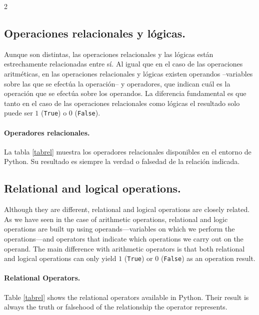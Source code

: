 \begin{paracol}{2}
\subsection{Operaciones relacionales y lógicas.}
Aunque son distintas, las operaciones relacionales y las lógicas están estrechamente relacionadas entre sí. Al igual que en el caso de las operaciones aritméticas, en las operaciones relacionales y lógicas existen operandos --variables sobre las que se efectúa la operación-- y operadores, que indican cuál es la operación que se efectúa sobre los operandos. La diferencia fundamental es que tanto en el caso de las operaciones relacionales como lógicas el resultado solo puede ser $1$ (\texttt{True}) o $0$ (\texttt{False}). 

\paragraph{Operadores relacionales.}La tabla \ref{tabrel} muestra los operadores relacionales disponibles en el entorno de Python. Su resultado es siempre la verdad o falsedad de la relación indicada. 
\switchcolumn
\subsection{Relational and logical operations.}
Although they are different, relational and logical operations are closely related. As we have seen in the case of arithmetic operations, relational and logic operations are built up using operands—variables on which we perform the operations—and operators that indicate which operations we carry out on the operand.  The main difference with arithmetic operators is that both relational and logical operations can only yield $1$ (\texttt{True}) or $0$ (\texttt{False}) as an operation result.  

\paragraph{Relational Operators.} Table \ref{tabrel} shows the relational operators available in Python. Their result is always the truth or falsehood of the relationship the operator represents.
\end{paracol}


